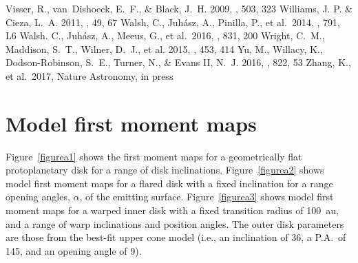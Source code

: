 \documentclass[onecolumn]{aastex6}
\begin{document}
\begin{thebibliography}{}
 Visser, R., van~Dishoeck, E.~F., \& Black, J.~H. 2009, \aap, 503, 323
 Williams, J. P. \& Cieza, L.~A. 2011, \araa, 49, 67
 Walsh, C., Juh\'{a}sz, A., Pinilla, P., et al.~2014, \apjl, 791, L6
 Walsh. C., Juh\'{a}sz, A., Meeus, G., et al.~2016, \apj, 831, 200
 Wright, C.~M., Maddison, S.~T., Wilner, D.~J., et al. 2015, \mnras, 453, 414
 Yu, M., Willacy, K., Dodson-Robinson, S.~E., Turner, N., \& Evans II, N.~J. 2016, \apj, 822, 53
 Zhang, K., et al.~2017, Nature Astronomy, in press
\end{thebibliography}

\appendix

\section{Model first moment maps}

Figure~\ref{figurea1} shows the first moment maps for a geometrically
flat protoplanetary disk for a range of disk inclinations.
Figure~\ref{figurea2} shows model first moment maps for a flared
disk with a fixed inclination for a range opening angles, $\alpha$, of the emitting
surface.
Figure~\ref{figurea3} shows model first moment maps for a warped inner disk
with a fixed transition radius of 100~au, and a range
of warp inclinations and position angles.
The outer disk parameters are those from the best-fit upper cone model
(i.e., an inclination of 36\degree, a P.A.~of 145\degree, and an opening angle
of 9\degree).
\end{document}
